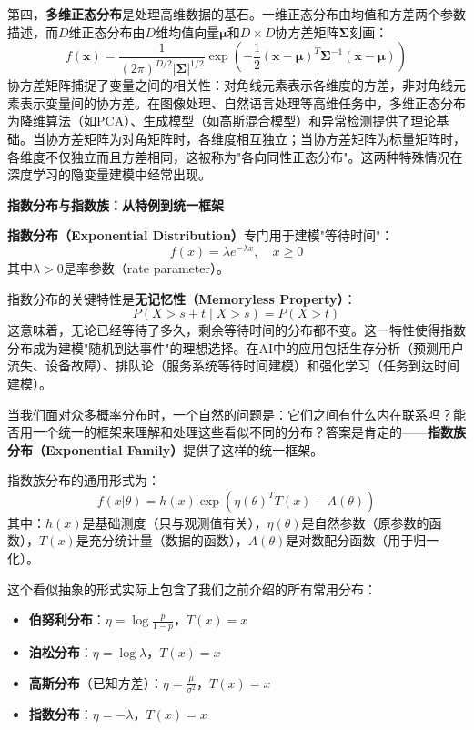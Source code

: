 第四，\textbf{多维正态分布}是处理高维数据的基石。一维正态分布由均值和方差两个参数描述，而$D$维正态分布由$D$维均值向量$\boldsymbol{\mu}$和$D\times D$协方差矩阵$\boldsymbol{\Sigma}$刻画：
\begin{equation}
f(\mathbf{x}) = \frac{1}{(2\pi)^{D/2}|\boldsymbol{\Sigma}|^{1/2}}\exp\left(-\frac{1}{2}(\mathbf{x}-\boldsymbol{\mu})^T\boldsymbol{\Sigma}^{-1}(\mathbf{x}-\boldsymbol{\mu})\right)
\end{equation}
协方差矩阵捕捉了变量之间的相关性：对角线元素表示各维度的方差，非对角线元素表示变量间的协方差。在图像处理、自然语言处理等高维任务中，多维正态分布为降维算法（如PCA）、生成模型（如高斯混合模型）和异常检测提供了理论基础。当协方差矩阵为对角矩阵时，各维度相互独立；当协方差矩阵为标量矩阵时，各维度不仅独立而且方差相同，这被称为"各向同性正态分布"。这两种特殊情况在深度学习的隐变量建模中经常出现。

\textbf{指数分布与指数族：从特例到统一框架}

\textbf{指数分布（Exponential Distribution）}专门用于建模"等待时间"：
\begin{equation}
f(x) = \lambda e^{-\lambda x}, \quad x \geq 0
\end{equation}
其中$\lambda > 0$是率参数（rate parameter）。

指数分布的关键特性是\textbf{无记忆性（Memoryless Property）}：
\begin{equation}
P(X > s+t \mid X > s) = P(X > t)
\end{equation}
这意味着，无论已经等待了多久，剩余等待时间的分布都不变。这一特性使得指数分布成为建模"随机到达事件"的理想选择。在AI中的应用包括生存分析（预测用户流失、设备故障）、排队论（服务系统等待时间建模）和强化学习（任务到达时间建模）。

当我们面对众多概率分布时，一个自然的问题是：它们之间有什么内在联系吗？能否用一个统一的框架来理解和处理这些看似不同的分布？答案是肯定的——\textbf{指数族分布（Exponential Family）}提供了这样的统一框架。

指数族分布的通用形式为：
\begin{equation}
f(x|\theta) = h(x)\exp\left(\eta(\theta)^T T(x) - A(\theta)\right)
\end{equation}
其中：$h(x)$是基础测度（只与观测值有关），$\eta(\theta)$是自然参数（原参数的函数），$T(x)$是充分统计量（数据的函数），$A(\theta)$是对数配分函数（用于归一化）。

这个看似抽象的形式实际上包含了我们之前介绍的所有常用分布：
\begin{itemize}
  \item \textbf{伯努利分布}：$\eta = \log\frac{p}{1-p}$，$T(x) = x$
  \item \textbf{泊松分布}：$\eta = \log\lambda$，$T(x) = x$
  \item \textbf{高斯分布}（已知方差）：$\eta = \frac{\mu}{\sigma^2}$，$T(x) = x$
  \item \textbf{指数分布}：$\eta = -\lambda$，$T(x) = x$
\end{itemize}

